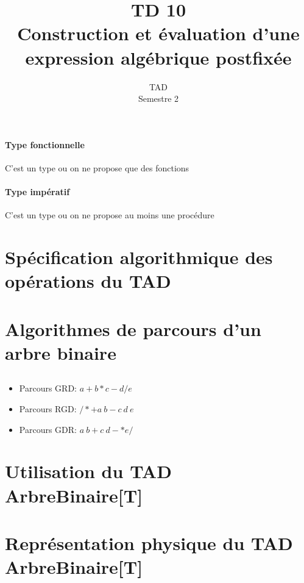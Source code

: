 \documentclass{article}
\title{TD 10\\ Construction et évaluation d'une expression algébrique postfixée}
\date{TAD\\ Semestre 2}
\begin{document}
	\maketitle
	\paragraph{Type fonctionnelle} C'est un type ou on ne propose que des fonctions
	\paragraph{Type impératif} C'est un type ou on ne propose au moins une procédure
	\section{Spécification algorithmique des opérations du TAD}
		
	\section{Algorithmes de parcours d'un arbre binaire}
		\subsection{}
			
			\begin{itemize}
				\item Parcours GRD: $a+b*c-d/e$
				\item Parcours RGD: $/*+a~b-c~d~e$
				\item Parcours GDR: $a~b+c~d-*e/$
			\end{itemize}
		\subsection{}
			
	\section{Utilisation du TAD ArbreBinaire[T]}			
		\subsection{}
			
	\section{Représentation physique du TAD ArbreBinaire[T]}
			
\end{document}
